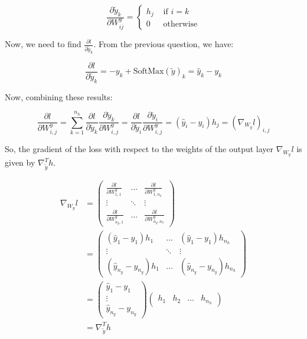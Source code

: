 \[
    \frac{\partial \tilde{y}_k }{\partial W^y_{ij}} = \begin{cases}
        h_j & \text{ if } i=k   \\
        0   & \text{ otherwise}
    \end{cases}
\]

Now, we need to find \( \frac{\partial l}{\partial \tilde{y}_k} \). From the previous question, we have:

\[
    \frac{\partial l}{\partial \tilde{y}_k} = -y_k + \text{SoftMax}(\tilde{y})_k = \hat{y}_k - y_k
\]

Now, combining these results:

\[
    \frac{\partial l}{\partial W_{i,j}^y} = \sum_{k=1}^{n_h} \frac{\partial l}{\partial \tilde{y}_k} \frac{\partial \tilde{y}_k}{\partial W_{i,j}^y} =  \frac{\partial l}{\partial \tilde{y}_i} \frac{\partial \tilde{y}_i}{\partial W_{i,j}^y} = (\hat{y}_i - y_i) h_j = (\nabla _{W_y} l)_{i,j}
\]

So, the gradient of the loss with respect to the weights of the output layer \( \nabla_{W_y} l \) is given by \( \nabla _{\tilde{y}} ^T h \).

\begin{align*}
    \nabla_{W_y} l & = \begin{pmatrix}
        \frac{\partial l}{\partial W^y_{1,1}}   & \dots  & \frac{\partial l}{\partial W^y_{1,n_h}}    \\
        \vdots                                  & \ddots & \vdots                                     \\
        \frac{\partial l}{\partial W^y_{n_y,1}} & \dots  & \frac{\partial l}{\partial W^y_{n_y, n_h}}
    \end{pmatrix}                            \\
                   & = \begin{pmatrix}
        (\hat{y}_1 - y_1) h_{1}         & \dots  & (\hat{y}_1 - y_1) h_{n_h}         \\
        \vdots                          & \ddots & \vdots                            \\
        (\hat{y}_{n_y} - y_{n_y}) h_{1} & \dots  & (\hat{y}_{n_y} - y_{n_y}) h_{n_h}
    \end{pmatrix}                            \\
                   & = \begin{pmatrix}
        \hat{y}_1 - y_1 \\
        \vdots          \\
        \hat{y}_{n_y} - y_{n_y}
    \end{pmatrix} \begin{pmatrix}
        h_1 & h_2 & \dots & h_{n_h}
    \end{pmatrix} \\
                   & = \nabla _{\tilde{y}} ^T h
\end{align*}


